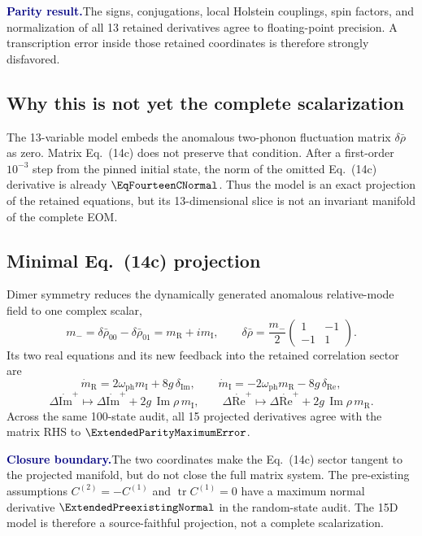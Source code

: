 \documentclass[10pt]{article}
\newcommand{\findingbox}[2]{%
  \colorbox{pale}{%
    \parbox{\dimexpr\linewidth-2\fboxsep\relax}{%
      \textcolor{navy}{\textbf{#1}}\quad #2%
    }%
  }%
}
\begin{document}
\findingbox{Parity result.}{The signs, conjugations, local Holstein couplings,
spin factors, and normalization of all 13 retained derivatives agree to
floating-point precision. A transcription error inside those retained
coordinates is therefore strongly disfavored.}

\subsection*{Why this is not yet the complete scalarization}

The 13-variable model embeds the anomalous two-phonon fluctuation matrix
\(\delta\bar\rho\) as zero. Matrix Eq.~(14c) does not preserve that condition.
After a first-order \(10^{-3}\) step from the pinned initial state, the norm of
the omitted Eq.~(14c) derivative is already
\(\EqFourteenCNormal\). Thus the model is an exact projection of the retained
equations, but its 13-dimensional slice is not an invariant manifold of the
complete EOM.

\subsection*{Minimal Eq.~(14c) projection}

Dimer symmetry reduces the dynamically generated anomalous relative-mode
field to one complex scalar,
\[
m_-=\delta\bar\rho_{00}-\delta\bar\rho_{01}
    =m_{\mathrm R}+i m_{\mathrm I},
\qquad
\delta\bar\rho=\frac{m_-}{2}
\begin{pmatrix}1&-1\\-1&1\end{pmatrix}.
\]
Its two real equations and its new feedback into the retained correlation
sector are
\[
\dot m_{\mathrm R}=2\omega_{\mathrm{ph}}m_{\mathrm I}
+8g\,\delta_{\mathrm{Im}},
\qquad
\dot m_{\mathrm I}=-2\omega_{\mathrm{ph}}m_{\mathrm R}
-8g\,\delta_{\mathrm{Re}},
\]
\[
\Delta\dot{\mathrm{Im}}^{+}\mapsto
\Delta\dot{\mathrm{Im}}^{+}+2g\,\operatorname{Im}\rho\,m_{\mathrm I},
\qquad
\Delta\dot{\mathrm{Re}}^{+}\mapsto
\Delta\dot{\mathrm{Re}}^{+}+2g\,\operatorname{Im}\rho\,m_{\mathrm R}.
\]
Across the same 100-state audit, all 15 projected derivatives agree with the
matrix RHS to \(\ExtendedParityMaximumError\).

\findingbox{Closure boundary.}{The two coordinates make the Eq.~(14c) sector
tangent to the projected manifold, but do not close the full matrix system.
The pre-existing assumptions \(C^{(2)}=-C^{(1)}\) and
\(\operatorname{tr}C^{(1)}=0\) have a maximum normal derivative
\(\ExtendedPreexistingNormal\) in the random-state audit. The 15D model is
therefore a source-faithful projection, not a complete scalarization.}
\end{document}

